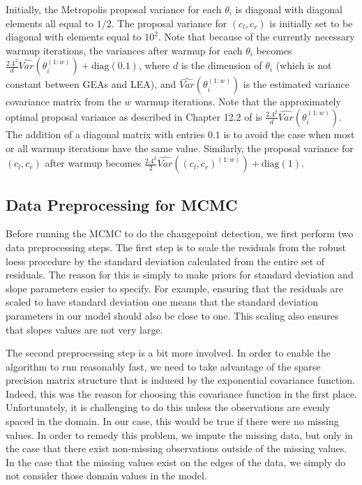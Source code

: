 \documentclass[12pt]{article}
\begin{document}
Initially, the Metropolis proposal variance for each \(\theta_i\) is
diagonal with diagonal elements all equal to \(1/2\). The proposal
variance for \((c_l, c_r)\) is initially set to be diagonal with
elements equal to \(10^2\). Note that because of the currently necessary
warmup iterations, the variances after warmup for each \(\theta_i\)
becomes
\(\frac{2.4^2}{d}\hat{Var}(\theta_i^{(1:w)}) + \text{diag}(0.1)\), where
\(d\) is the dimension of \(\theta_i\) (which is not constant between
GEAs and LEA), and \(\hat{Var}(\theta_i^{(1:w)})\) is the estimated
variance covariance matrix from the \(w\) warmup iterations. Note that
the approximately optimal proposal variance as described in Chapter 12.2
of \citet{gelman2013} is \(\frac{2.4^2}{d}\hat{Var}(\theta_i^{(1:w)})\).
The addition of a diagonal matrix with entries \(0.1\) is to avoid the
case when most or all warmup iterations have the same value. Similarly,
the proposal variance for \((c_l, c_r)\) after warmup becomes
\(\frac{2.4^2}{2}\hat{Var}((c_l,c_r)^{(1:w)}) + \text{diag}(1)\).

\subsection{Data Preprocessing for MCMC}

Before running the MCMC to do the changepoint detection, we first
perform two data preprocessing steps. The first step is to scale the
residuals from the robust loess procedure by the standard deviation
calculated from the entire set of residuals. The reason for this is
simply to make priors for standard deviation and slope parameters easier
to specify. For example, ensuring that the residuals are scaled to have
standard deviation one means that the standard deviation parameters in
our model should also be close to one. This scaling also ensures that
slopes values are not very large.

The second preprocessing step is a bit more involved. In order to enable
the algorithm to run reasonably fast, we need to take advantage of the
sparse precision matrix structure that is induced by the exponential
covariance function. Indeed, this was the reason for choosing this
covariance function in the first place. Unfortunately, it is challenging
to do this unless the observations are evenly spaced in the domain. In
our case, this would be true if there were no missing values. In order
to remedy this problem, we impute the missing data, but only in the case
that there exist non-missing observations outside of the missing values.
In the case that the missing values exist on the edges of the data, we
simply do not consider those domain values in the model.
\end{document}
